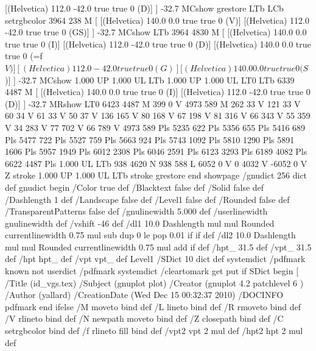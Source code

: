 [(Helvetica) 112.0 -42.0 true true 0 (D)]
] -32.7 MCshow
grestore
LTb
LCb setrgbcolor
3964 238 M
[ [(Helvetica) 140.0 0.0 true true 0 (V)]
[(Helvetica) 112.0 -42.0 true true 0 (GS)]
] -32.7 MCshow
LTb
3964 4830 M
[ [(Helvetica) 140.0 0.0 true true 0 (I)]
[(Helvetica) 112.0 -42.0 true true 0 (D)]
[(Helvetica) 140.0 0.0 true true 0 (=f\(V)]
[(Helvetica) 112.0 -42.0 true true 0 (G)]
[(Helvetica) 140.0 0.0 true true 0 (S\))]
] -32.7 MCshow
1.000 UP
1.000 UL
LTb
1.000 UP
1.000 UL
LT0
LTb
6339 4487 M
[ [(Helvetica) 140.0 0.0 true true 0 (I)]
[(Helvetica) 112.0 -42.0 true true 0 (D)]
] -32.7 MRshow
LT0
6423 4487 M
399 0 V
4973 589 M
262 33 V
121 33 V
60 34 V
61 33 V
50 37 V
136 165 V
80 168 V
67 198 V
81 316 V
66 343 V
55 359 V
34 283 V
77 702 V
66 789 V
4973 589 Pls
5235 622 Pls
5356 655 Pls
5416 689 Pls
5477 722 Pls
5527 759 Pls
5663 924 Pls
5743 1092 Pls
5810 1290 Pls
5891 1606 Pls
5957 1949 Pls
6012 2308 Pls
6046 2591 Pls
6123 3293 Pls
6189 4082 Pls
6622 4487 Pls
1.000 UL
LTb
938 4620 N
938 588 L
6052 0 V
0 4032 V
-6052 0 V
Z stroke
1.000 UP
1.000 UL
LTb
stroke
grestore
end
showpage
/gnudict 256 dict def
gnudict begin
%
%
/Color true def
/Blacktext false def
/Solid false def
/Dashlength 1 def
/Landscape false def
/Level1 false def
/Rounded false def
/TransparentPatterns false def
/gnulinewidth 5.000 def
/userlinewidth gnulinewidth def
%
/vshift -46 def
/dl1 {
  10.0 Dashlength mul mul
  Rounded { currentlinewidth 0.75 mul sub dup 0 le { pop 0.01 } if } if
} def
/dl2 {
  10.0 Dashlength mul mul
  Rounded { currentlinewidth 0.75 mul add } if
} def
/hpt_ 31.5 def
/vpt_ 31.5 def
/hpt hpt_ def
/vpt vpt_ def
Level1 {} {
/SDict 10 dict def
systemdict /pdfmark known not {
  userdict /pdfmark systemdict /cleartomark get put
} if
SDict begin [
  /Title (id_vgs.tex)
  /Subject (gnuplot plot)
  /Creator (gnuplot 4.2 patchlevel 6 )
  /Author (yallard)
  /CreationDate (Wed Dec 15 00:32:37 2010)
  /DOCINFO pdfmark
end
} ifelse
%
%
/M {moveto} bind def
/L {lineto} bind def
/R {rmoveto} bind def
/V {rlineto} bind def
/N {newpath moveto} bind def
/Z {closepath} bind def
/C {setrgbcolor} bind def
/f {rlineto fill} bind def
/vpt2 vpt 2 mul def
/hpt2 hpt 2 mul def
